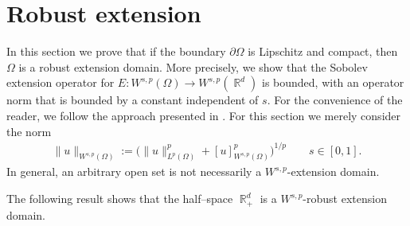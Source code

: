 \documentclass[12pt, reqno]{amsart}%
\theoremstyle{plain}  %
\theoremstyle{definition}  %
\newtheorem{definition}[theorem]{Definition}
\theoremstyle{remark}
\numberwithin{equation}{section}
\DeclareMathOperator{\supp}{supp}
\DeclareMathOperator{\R}{\mathbb{R}}
\begin{document}
\section{Robust extension}\label{sec:robust-exten}
In this section we prove that if the boundary $\partial \Omega$ is Lipschitz and compact, then $\Omega$ is a robust extension domain. More precisely, we show that the Sobolev extension operator for $E: W^{s,p}(\Omega)\to W^{s,p}(\R^d)$ is bounded, with an operator norm that is bounded by a constant  independent of $s$. For the convenience of the reader, we follow the approach presented in \cite{Hitchhiker}. For this section we merely consider the norm
\begin{align*}
\|u\|_{W^{s,p}(\Omega)}:=  \big(\|u\|^p_{L^p(\Omega)}+ [u]^p_{W^{s,p}(\Omega)} \big)^{1/p}\qquad s\in [0,1].
\end{align*}
In general, an arbitrary open set is not necessarily a $W^{s,p}$-extension domain.

The following result shows that the half–space $\R^d_+$ is a $W^{s,p}$-robust extension domain.
\end{document}
